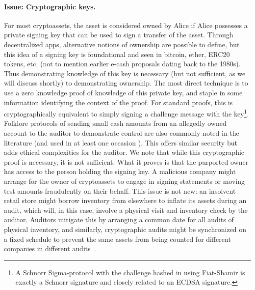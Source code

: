 \paragraph{Issue: Cryptographic keys.} For most cryptoassets, the asset is considered owned by Alice if Alice possesses a private signing key that can be used to sign a transfer of the asset. Through decentralized apps, alternative notions of ownership are possible to define, but this idea of a signing key is foundational and seen in bitcoin, ether, ERC20 tokens, etc. (not to mention earlier e-cash proposals dating back to the 1980s). Thus demonstrating knowledge of this key is necessary (but not sufficient, as we will discuss shortly) to demonstrating ownership. The most direct technique is to use a zero knowledge proof of knowledge of this private key, and staple in some information identifying the context of the proof. For standard proofs, this is cryptographically equivalent to simply signing a challenge message with the key\footnote{A Schnorr Sigma-protocol with the challenge hashed in using Fiat-Shamir is exactly a Schnorr signature and closely related to an ECDSA signature.}. Folklore protocols of sending small cash amounts from an allegedly owned account to the auditor to demonstrate control are also commonly noted in the literature (and used in at least one occasion \todo{[cite]}). This offers similar security but adds ethical complexities for the auditor.
We note that while this cryptographic proof is necessary, it is not sufficient. What it proves is that the purported owner has access to the person holding the signing key. A malicious company might arrange for the owner of cryptoassets to engage in signing statements or moving test amounts fraudulently on their behalf. This issue is not new: an insolvent retail store might borrow inventory from elsewhere to inflate its assets during an audit, which will, in this case, involve a physical visit and inventory check by the auditor. Auditors mitigate this by arranging a common date for all audits of physical inventory, and similarly, cryptographic audits might be synchronized on a fixed schedule to prevent the same assets from being counted for different companies in different audits~\cite{dagher2015provisions}. 

